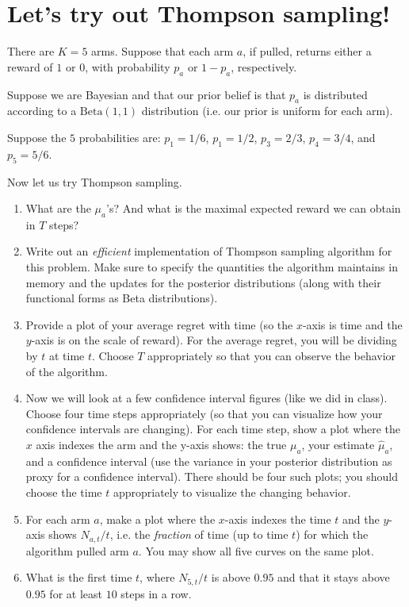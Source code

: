 \documentclass{article}
\begin{document}
\section{Let's try out Thompson sampling!}

There are $K=5$ arms. Suppose that each arm $a$, if pulled, returns either a reward of  $1$ or $0$, with probability $p_a$ or $1-p_a$, respectively.

Suppose we are Bayesian and that our prior belief is that $p_a$ is distributed according to a $\textrm{Beta}(1,1)$ distribution (i.e. our prior is uniform for each arm).

Suppose the $5$ probabilities are: $p_1=1/6$, $p_1=1/2$, $p_3=2/3$, $p_4=3/4$, and $p_5=5/6$.

Now let us try Thompson sampling.

\begin{enumerate}
	\item What are the $\mu_a$'s? And what is the maximal expected reward we can obtain in $T$ steps?
	\item Write out an \emph{efficient} implementation of Thompson sampling algorithm for this problem. Make sure to specify the quantities the algorithm maintains in memory and the updates for the posterior distributions (along with their functional forms as Beta distributions).
	\item Provide a plot of your average regret with time (so the $x$-axis is time and the $y$-axis is on the scale of reward). For the average regret, you will be dividing by $t$ at time $t$. Choose $T$ appropriately so that you can observe the behavior of the algorithm.
	\item Now we will look at a few confidence interval figures (like we did in class). Choose four time steps appropriately (so that you can visualize how your confidence intervals are changing). For each time step, show a plot where the $x$ axis indexes the arm and the y-axis shows: the true $\mu_a$, your estimate $\hat \mu_a$, and a confidence interval (use the variance in your posterior distribution as proxy for a confidence interval). There should be four such plots; you should choose the time $t$ appropriately to visualize the changing behavior.
	\item For each arm $a$, make a plot where the $x$-axis indexes the time $t$ and the $y$-axis shows $N_{a,t}/t$, i.e. the \emph{fraction} of time (up to time $t$) for which the algorithm pulled arm $a$. You may show all five curves on the same plot.
	\item What is the first time $t$, where $N_{5,t}/t$ is above $0.95$ and that it stays above $0.95$ for at least $10$ steps in a row.
\end{enumerate}
\end{document}
